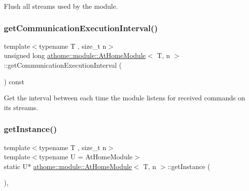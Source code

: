Flush all streams used by the module. \mbox{\label{classathome_1_1module_1_1_at_home_module_a263fe0bea2fa480b3885fee07e2a8221}} 
\subsubsection{\texorpdfstring{get\+Communication\+Execution\+Interval()}{getCommunicationExecutionInterval()}}
{\footnotesize\ttfamily template$<$typename T , size\+\_\+t n$>$ \\
unsigned long \mbox{\hyperlink{classathome_1_1module_1_1_at_home_module}{athome\+::module\+::\+At\+Home\+Module}}$<$ T, n $>$\+::get\+Communication\+Execution\+Interval (\begin{DoxyParamCaption}{ }\end{DoxyParamCaption}) const\hspace{0.3cm}{\ttfamily [inline]}}

Get the interval between each time the module listens for received commands on its streams. \mbox{\label{classathome_1_1module_1_1_at_home_module_acc6e7fc0d86f11648fd81729484e546f}} 
\subsubsection{\texorpdfstring{get\+Instance()}{getInstance()}}
{\footnotesize\ttfamily template$<$typename T , size\+\_\+t n$>$ \\
template$<$typename U  = At\+Home\+Module$>$ \\
static U$\ast$ \mbox{\hyperlink{classathome_1_1module_1_1_at_home_module}{athome\+::module\+::\+At\+Home\+Module}}$<$ T, n $>$\+::get\+Instance (\begin{DoxyParamCaption}{ }\end{DoxyParamCaption})\hspace{0.3cm}{\ttfamily [inline]}, {\ttfamily [static]}}

